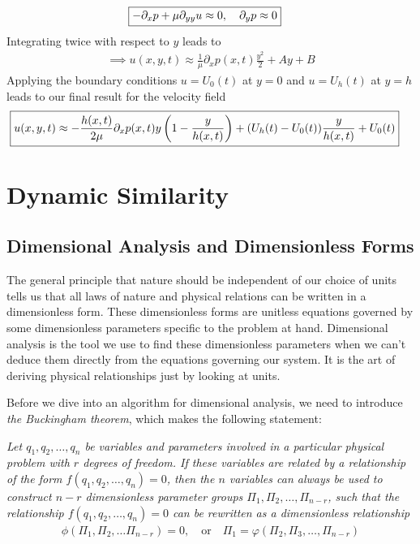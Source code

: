 \documentclass[a4paper, 12pt]{article}
\numberwithin{equation}{subsubsection}
\begin{document}
\begin{align}
	\Aboxed{- \partial_x p + \mu \partial_{yy} u \approx 0, \quad \partial_y p \approx 0}
\end{align}
Integrating twice with respect to $y$ leads to
\begin{align}
	\implies u(x,y,t) \approx \frac{1}{\mu} \partial_x p(x,t) \frac{y^2}{2} + Ay + B
\end{align}
Applying the boundary conditions $u = U_0(t)$ at $y=0$ and $u = U_h(t)$ at $y=h$ leads to our final result for the velocity field
\begin{align}
	\Aboxed{u(x,y,t) \approx -\frac{h(x,t)}{2\mu} \partial_x p(x,t) y \left( 1 - \frac{y}{h(x,t)} \right) + (U_h(t) - U_0(t)) \frac{y}{h(x,t)} + U_0(t)}
\end{align}




\newpage
\section{Dynamic Similarity}
\subsection{Dimensional Analysis and Dimensionless Forms}
The general principle that nature should be independent of our choice of units tells us that all laws of nature and physical relations can be written in a dimensionless form. These dimensionless forms are unitless equations governed by some dimensionless parameters specific to the problem at hand. Dimensional analysis is the tool we use to find these dimensionless parameters when we can't deduce them directly from the equations governing our system. It is the art of deriving physical relationships just by looking at units.

Before we dive into an algorithm for dimensional analysis, we need to introduce \textit{the Buckingham theorem}, which makes the following statement:

\textit{Let $q_1, q_2, \dots, q_n$ be variables and parameters involved in a particular physical problem with $r$ degrees of freedom. If these variables are related by a relationship of the form $f(q_1, q_2, \dots, q_n) = 0$, then the $n$ variables can always be used to construct $n-r$ dimensionless parameter groups $\Pi_1, \Pi_2, \dots, \Pi_{n - r}$, such that the relationship $f(q_1, q_2, \dots, q_n) = 0$ can be rewritten as a dimensionless relationship}
\begin{align}
	\phi(\Pi_1, \Pi_2, \dots \Pi_{n - r}) = 0, \quad \text{or} \quad \Pi_1 = \varphi(\Pi_2, \Pi_3, \dots, \Pi_{n-r}) \label{eq:dimensional_analysis_buckingham_theorem}
\end{align}
\end{document}

